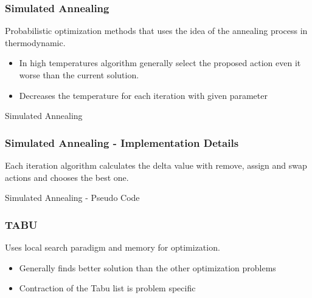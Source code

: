 \documentclass{beamer}
\makeatletter
\newenvironment{algorithm}[1][]{%
  \def\@captype{algorithm}%
  \par\nobreak\begin{center}\nobreak}
  {\par\nobreak\end{center}\nobreak}
\newcounter{algorithm}
\makeatother
\begin{document}
\begin{frame}[shrink=20]
\frametitle {Simulated Annealing}
Probabilistic optimization methods that uses the idea of the annealing process in thermodynamic.
\begin{itemize}
\item In high temperatures algorithm generally select the proposed action even it worse than the current solution.
\item Decreases the temperature for each iteration with given parameter
\end{itemize}

\begin{algorithm}[H]
\begin{algorithmic}[1]
\REPEAT
{}
\ENDIF
{}
\end{algorithmic}
\caption{Simulated Annealing }
\label{alg:seq}
\end{algorithm}
\end{frame}

\begin{frame}[shrink=20]
\frametitle{Simulated Annealing  - Implementation Details}
Each iteration algorithm calculates the delta value with remove, assign and swap actions and chooses the best one. 
\begin{algorithm}[H]
\begin{algorithmic}[1]
\REPEAT
\REPEAT
{}
\ENDIF
{}
\end{algorithmic}
\caption{Simulated Annealing - Pseudo Code}
\label{alg:seq}
\end{algorithm}
\end{frame}

\begin{frame}
\frametitle{TABU}
Uses local search paradigm and memory for optimization.
\begin{itemize}
\item Generally finds better solution than the other optimization problems
\item Contraction of the Tabu list is problem specific
\end{itemize}
\end{frame}
\end{document}
